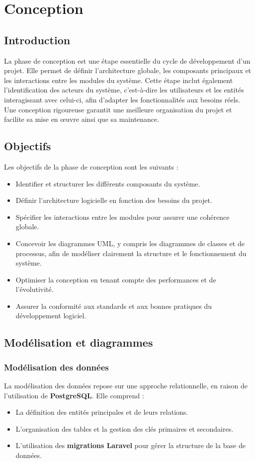 \chapter{Conception}
\clearpage

\section{Introduction}
La phase de conception est une étape essentielle du cycle de développement d'un projet. Elle permet de définir l'architecture globale, les composants principaux et les interactions entre les modules du système. Cette étape inclut également l'identification des acteurs du système, c'est-à-dire les utilisateurs et les entités interagissant avec celui-ci, afin d'adapter les fonctionnalités aux besoins réels. Une conception rigoureuse garantit une meilleure organisation du projet et facilite sa mise en œuvre ainsi que sa maintenance.

\section{Objectifs}
Les objectifs de la phase de conception sont les suivants :
\begin{itemize}
    \item Identifier et structurer les différents composants du système.
    \item Définir l'architecture logicielle en fonction des besoins du projet.
    \item Spécifier les interactions entre les modules pour assurer une cohérence globale.
    \item Concevoir les diagrammes UML, y compris les diagrammes de classes et de processus, afin de modéliser clairement la structure et le fonctionnement du système.
    \item Optimiser la conception en tenant compte des performances et de l'évolutivité.
    \item Assurer la conformité aux standards et aux bonnes pratiques du développement logiciel.
\end{itemize}


\section{Modélisation et diagrammes}

\subsection{Modélisation des données}
La modélisation des données repose sur une approche relationnelle, en raison de l'utilisation de \textbf{PostgreSQL}. Elle comprend :
\begin{itemize}
    \item La définition des entités principales et de leurs relations.
    \item L'organisation des tables et la gestion des clés primaires et secondaires.
    \item L'utilisation des \textbf{migrations Laravel} pour gérer la structure de la base de données.
\end{itemize}

